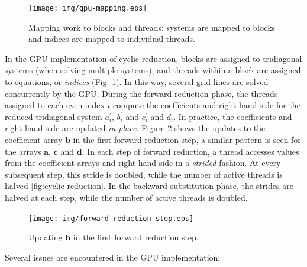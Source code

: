 \begin{figure}
\begin{center}
\texttt{[image: img/gpu-mapping.eps]}
\end{center}
\caption{Mapping work to blocks and threads:
systems are mapped to blocks and
indices are mapped to individual threads.}
\label{fig:gpu-mapping}
\end{figure}
%
In the GPU implementation of cyclic reduction,
blocks are assigned to tridiagonal systems
(when solving multiple systems),
and threads within a block 
are assigned to equations, or \emph{indices}
(Fig. \ref{fig:gpu-mapping}).
In this way, several grid lines are solved concurrently
by the GPU.
During the forward reduction phase,
the threads assigned to each even index $i$
compute the coefficients
and right hand side for the reduced tridiagonal system
$a_i^\prime$, $b_i^\prime$ and $c_i^\prime$
and $d_i^\prime$.
In practice, the coefficients and right hand side
are updated \emph{in-place}.
Figure \ref{fig:forward-reduction-step} shows the updates
to the coefficient array $\bm{b}$
in the first forward reduction step,
a similar pattern is seen for the arrays
$\bm{a}$, $\bm{c}$ and $\bm{d}$.
In each step of forward reduction,
a thread accesses values from the
coefficient arrays and right hand side
in a \emph{strided} fashion.
At every subsequent step,
this stride is doubled, while the number of active threads is halved
\ref{fig:cyclic-reduction}.
In the backward substitution phase,
the strides are halved at each step,
while the number of active threads is doubled.

\begin{figure}
\begin{center}
\texttt{[image: img/forward-reduction-step.eps]}
\end{center}
\caption{Updating $\bm{b}$ in the first forward reduction step.}
\label{fig:forward-reduction-step}
\end{figure}

Several issues are encountered in the GPU implementation:

